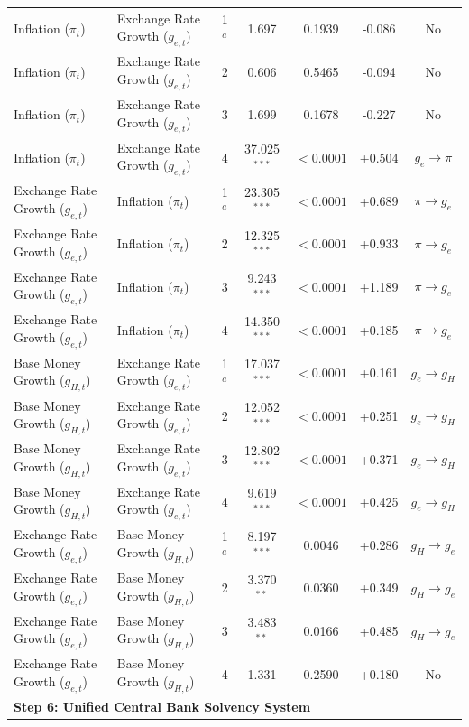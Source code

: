 \begin{table}[p]
{\begin{tabular}{llccccc}
Inflation ($\pi_t$) & Exchange Rate Growth ($g_{e,t}$) & 1$^a$ & 1.697 & 0.1939 & -0.086 & No \\
Inflation ($\pi_t$) & Exchange Rate Growth ($g_{e,t}$) & 2 & 0.606 & 0.5465 & -0.094 & No \\
Inflation ($\pi_t$) & Exchange Rate Growth ($g_{e,t}$) & 3 & 1.699 & 0.1678 & -0.227 & No \\
Inflation ($\pi_t$) & Exchange Rate Growth ($g_{e,t}$) & 4 & 37.025$^{***}$ & $< 0.0001$ & +0.504 & $g_e \to \pi$ \\
Exchange Rate Growth ($g_{e,t}$) & Inflation ($\pi_t$) & 1$^a$ & 23.305$^{***}$ & $< 0.0001$ & +0.689 & $\pi \to g_e$ \\
Exchange Rate Growth ($g_{e,t}$) & Inflation ($\pi_t$) & 2 & 12.325$^{***}$ & $< 0.0001$ & +0.933 & $\pi \to g_e$ \\
Exchange Rate Growth ($g_{e,t}$) & Inflation ($\pi_t$) & 3 & 9.243$^{***}$ & $< 0.0001$ & +1.189 & $\pi \to g_e$ \\
Exchange Rate Growth ($g_{e,t}$) & Inflation ($\pi_t$) & 4 & 14.350$^{***}$ & $< 0.0001$ & +0.185 & $\pi \to g_e$ \\
Base Money Growth ($g_{H,t}$) & Exchange Rate Growth ($g_{e,t}$) & 1$^a$ & 17.037$^{***}$ & $< 0.0001$ & +0.161 & $g_e \to g_H$ \\
Base Money Growth ($g_{H,t}$) & Exchange Rate Growth ($g_{e,t}$) & 2 & 12.052$^{***}$ & $< 0.0001$ & +0.251 & $g_e \to g_H$ \\
Base Money Growth ($g_{H,t}$) & Exchange Rate Growth ($g_{e,t}$) & 3 & 12.802$^{***}$ & $< 0.0001$ & +0.371 & $g_e \to g_H$ \\
Base Money Growth ($g_{H,t}$) & Exchange Rate Growth ($g_{e,t}$) & 4 & 9.619$^{***}$ & $< 0.0001$ & +0.425 & $g_e \to g_H$ \\
Exchange Rate Growth ($g_{e,t}$) & Base Money Growth ($g_{H,t}$) & 1$^a$ & 8.197$^{***}$ & 0.0046 & +0.286 & $g_H \to g_e$ \\
Exchange Rate Growth ($g_{e,t}$) & Base Money Growth ($g_{H,t}$) & 2 & 3.370$^{**}$ & 0.0360 & +0.349 & $g_H \to g_e$ \\
Exchange Rate Growth ($g_{e,t}$) & Base Money Growth ($g_{H,t}$) & 3 & 3.483$^{**}$ & 0.0166 & +0.485 & $g_H \to g_e$ \\
Exchange Rate Growth ($g_{e,t}$) & Base Money Growth ($g_{H,t}$) & 4 & 1.331 & 0.2590 & +0.180 & No \\
\multicolumn{7}{l}{\textbf{Step 6: Unified Central Bank Solvency System}} \\[0.15em]

\end{tabular}}
\end{table}
